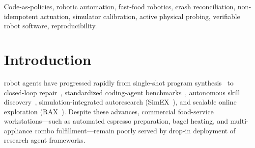 \documentclass[10pt,journal]{IEEEtran}
\begin{document}
\begin{abstract}
$p{=}0.0005$ vs.\ adapted SimEX-Protocol at $0/20$) with $0$ online LLM calls and $2.23\,\mathrm{s}$ $p_{95}$ latency ($24\times$ faster than online-regenerating CaP-X). Physical-robot qualification remains pending; no simulation result is claimed as hardware safety approval.
\end{abstract}

\begin{IEEEkeywords}\normalfont
Code-as-policies, robotic automation, fast-food robotics, crash reconciliation, non-idempotent actuation, simulator calibration, active physical probing, verifiable robot software, reproducibility.
\end{IEEEkeywords}

\section{Introduction}
\label{sec:intro}

 robot agents have progressed rapidly from single-shot program synthesis~\cite{liang2022cap,singh2022progprompt} to closed-loop repair~\cite{schlesinger2024roborepair,ahn2025reliablecap}, standardized coding-agent benchmarks~\cite{fu2026capx}, autonomous skill discovery~\cite{lu2026aspire,enpire2026,ace2026}, simulation-integrated autoresearch (SimEX~\cite{hu2026simex}), and scalable online exploration (RAX~\cite{huang2026rax}). Despite these advances, commercial food-service workstations---such as automated espresso preparation, bagel heating, and multi-appliance combo fulfillment---remain poorly served by drop-in deployment of research agent frameworks.
\end{document}
